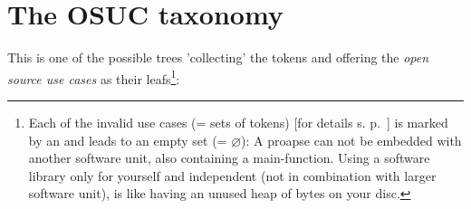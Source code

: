 \begin{footnotesize}
\begin{minipage}{\textwidth}
\end{minipage}
\end{footnotesize}  
  
\section{The OSUC taxonomy}

This is one of the possible trees 'collecting' the tokens and offering the
\emph{open source use cases} as their leafs\footnote{ Each of the invalid use
cases (= sets of tokens) [for details s. p.\
\pageref{InvalidFinderTokenCombinations}] is marked by an \lightning{} and leads
to an empty set (= $\varnothing$): A proapse can not be embedded with another
software unit, also containing a main-function. Using a software library only
for yourself and independent (not in combination with larger software unit), is
like having an unused heap of bytes on your disc.}:

